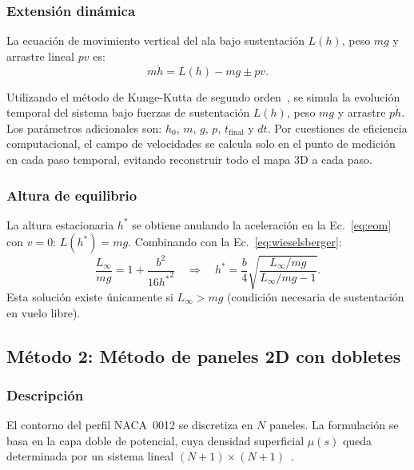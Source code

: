 \documentclass[twocolumn]{article}
\begin{document}
\subsubsection{Extensión dinámica}

La ecuación de movimiento vertical del ala bajo sustentación $L(h)$,
peso $mg$ y arrastre lineal $pv$ es:
\begin{equation}
  m\ddot{h} = L(h) - mg \pm pv.
  \label{eq:eom}
\end{equation}

Utilizando el método de Kunge-Kutta de segundo orden~\cite{burden2015}, se simula la evolución temporal del sistema bajo fuerzas de sustentación $L(h)$, peso $mg$ y arrastre $ p\dot{h}$. Los parámetros adicionales son: $h_0$, $m$, $g$, $p$, $t_{\text{final}}$ y $dt$. Por cuestiones de eficiencia computacional, el campo de velocidades se calcula solo en el punto de medición en cada paso temporal, evitando reconstruir todo el mapa 3D a cada paso.

\subsubsection{Altura de equilibrio}

La altura estacionaria $h^*$ se obtiene anulando la aceleración en la
Ec.~\eqref{eq:eom} con $v = 0$: $L(h^*) = mg$. Combinando con la
Ec.~\eqref{eq:wieselsberger}:
\begin{equation}
  \frac{L_\infty}{mg} = 1 + \frac{b^2}{16{h^*}^2}
  \quad \Longrightarrow \quad
  h^* = \frac{b}{4}\sqrt{\frac{L_\infty/mg}{L_\infty/mg - 1}}.
  \label{eq:heq}
\end{equation}
Esta solución existe únicamente si $L_\infty > mg$
(condición necesaria de sustentación en vuelo libre).

\subsection{Método 2: Método de paneles 2D con dobletes}

\subsubsection{Descripción}

El contorno del perfil NACA~0012 se discretiza en $N$ paneles.
La formulación se basa en la capa doble de potencial, cuya densidad
superficial $\mu(s)$ queda determinada por un sistema lineal
$(N+1)\times(N+1)$~\cite{hess1967}.
\end{document}
